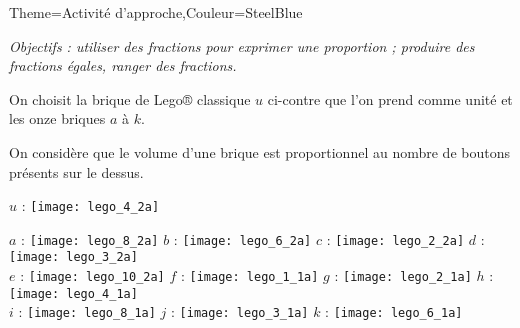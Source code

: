 \begin{Maquette}[Cours]{Theme={Activité d'approche},Couleur={SteelBlue}}


      {\it Objectifs : utiliser des fractions pour exprimer une proportion ; produire des fractions égales, ranger des fractions.}

      \begin{AActivite}

            \begin{minipage}{10cm}
               On choisit la brique de Lego® classique $u$ ci-contre que l'on prend comme unité et les onze briques $a$ à $k$. \par
               On considère que le volume d'une brique est proportionnel au nombre de \og boutons \fg{} présents sur le dessus.
            \end{minipage}
            \hspace{1cm}
            \begin{minipage}{5cm}
               $u$ : \texttt{[image: lego\_4\_2a]}
            \end{minipage} \par \bigskip
               $a$ : \texttt{[image: lego\_8\_2a]} \qquad 
               $b$ : \texttt{[image: lego\_6\_2a]} \qquad
               $c$ : \texttt{[image: lego\_2\_2a]} \qquad
               $d$ : \texttt{[image: lego\_3\_2a]} \\ [5mm]
               $e$ : \texttt{[image: lego\_10\_2a]} \qquad
               $f$ : \texttt{[image: lego\_1\_1a]} \qquad
               $g$ : \texttt{[image: lego\_2\_1a]} \qquad
               $h$ : \texttt{[image: lego\_4\_1a]} \\ [5mm]
               $i$ : \texttt{[image: lego\_8\_1a]} \qquad
               $j$ : \texttt{[image: lego\_3\_1a]} \qquad
               $k$ : \texttt{[image: lego\_6\_1a]} \bigskip
               

\end{AActivite}
\end{Maquette}
